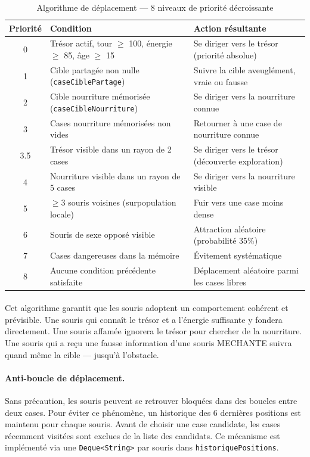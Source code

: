 \begin{table}[h!]
\centering
\renewcommand{\arraystretch}{1.5}
\begin{tabular}{|c|p{4.5cm}|p{5.5cm}|}
\hline
\textbf{Priorité} & \textbf{Condition} & \textbf{Action résultante} \\
\hline
0 & Trésor actif, tour $\geq$ 100, énergie $\geq$ 85, âge $\geq$ 15 & Se diriger vers le trésor (priorité absolue) \\
\hline
1 & Cible partagée non nulle (\texttt{caseCiblePartage}) & Suivre la cible aveuglément, vraie ou fausse \\
\hline
2 & Cible nourriture mémorisée (\texttt{caseCibleNourriture}) & Se diriger vers la nourriture connue \\
\hline
3 & Cases nourriture mémorisées non vides & Retourner à une case de nourriture connue \\
\hline
3.5 & Trésor visible dans un rayon de 2 cases & Se diriger vers le trésor (découverte exploration) \\
\hline
4 & Nourriture visible dans un rayon de 5 cases & Se diriger vers la nourriture visible \\
\hline
5 & $\geq 3$ souris voisines (surpopulation locale) & Fuir vers une case moins dense \\
\hline
6 & Souris de sexe opposé visible & Attraction aléatoire (probabilité 35\%) \\
\hline
7 & Cases dangereuses dans la mémoire & Évitement systématique \\
\hline
8 & Aucune condition précédente satisfaite & Déplacement aléatoire parmi les cases libres \\
\hline
\end{tabular}
\caption{Algorithme de déplacement --- 8 niveaux de priorité décroissante}
\label{tab:priorites}
\end{table}

\paragraph{} Cet algorithme garantit que les souris adoptent un comportement cohérent et prévisible. Une souris qui connaît le trésor et a l'énergie suffisante y fondera directement. Une souris affamée ignorera le trésor pour chercher de la nourriture. Une souris qui a reçu une fausse information d'une souris MECHANTE suivra quand même la cible — jusqu'à l'obstacle.

\paragraph{Anti-boucle de déplacement.} Sans précaution, les souris peuvent se retrouver bloquées dans des boucles entre deux cases. Pour éviter ce phénomène, un historique des 6 dernières positions est maintenu pour chaque souris. Avant de choisir une case candidate, les cases récemment visitées sont exclues de la liste des candidats. Ce mécanisme est implémenté via une \texttt{Deque<String>} par souris dans \texttt{historiquePositions}.

